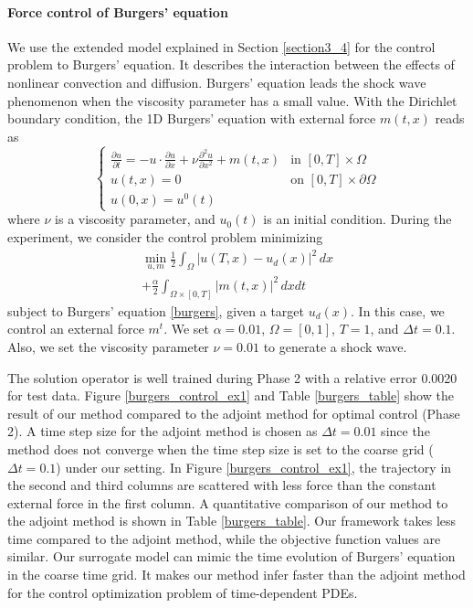 \documentclass[letterpaper]{article}
\begin{document}
\paragraph{Force control of Burgers' equation}
We use the extended model explained in Section \ref{section3_4} for the control problem to Burgers' equation. It describes the interaction between the effects of nonlinear convection and diffusion. Burgers' equation leads the shock wave phenomenon when the viscosity parameter has a small value. With the Dirichlet boundary condition, the 1D Burgers' equation with external force $m(t, x)$ reads as
\begin{equation}\label{burgers}
  \begin{cases}
    \frac{\partial u}{\partial t} = -u \cdot \frac{\partial u}{\partial x} + \nu \frac{\partial^2 u}{\partial x^2} + m(t, x) &\text{in }[0, T]\times\Omega\\
    u(t, x) = 0 \quad &\text{on } [0, T]\times\partial\Omega\\
    u(0, x) = u^0(t)
  \end{cases} 
\end{equation}
where $\nu$ is a viscosity parameter, and $u_0(t)$ is an initial condition. During the experiment, we consider the control problem minimizing
\begin{multline}
  \min_{u, m} \frac{1}{2}\int_{\Omega} |u(T, x) - u_d(x)|^2 \, dx \\
  + \frac{\alpha}{2} \int_{\Omega\times[0, T]} |m(t, x)|^2 \, dx dt
\end{multline}
subject to Burgers' equation \eqref{burgers}, given a target $u_d(x)$. In this case, we control an external force $m^t$. We set $\alpha=0.01$, $\Omega=[0,1]$, $T=1$, and $\Delta t=0.1$. Also, we set the viscosity parameter $\nu=0.01$ to generate a shock wave.

The solution operator is well trained during Phase 2 with a relative error 0.0020 for test data. Figure \ref{burgers_control_ex1} and Table \ref{burgers_table} show the result of our method compared to the adjoint method for optimal control (Phase 2). A time step size for the adjoint method is chosen as $\Delta t=0.01$ since the method does not converge when the time step size is set to the coarse grid ($\Delta t=0.1$) under our setting. In Figure \ref{burgers_control_ex1}, the trajectory in the second and third columns are scattered with less force than the constant external force in the first column. A quantitative comparison of our method to the adjoint method is shown in Table \ref{burgers_table}. Our framework takes less time compared to the adjoint method, while the objective function values are similar. Our surrogate model can mimic the time evolution of Burgers' equation in the coarse time grid. It makes our method infer faster than the adjoint method for the control optimization problem of time-dependent PDEs.
\end{document}
